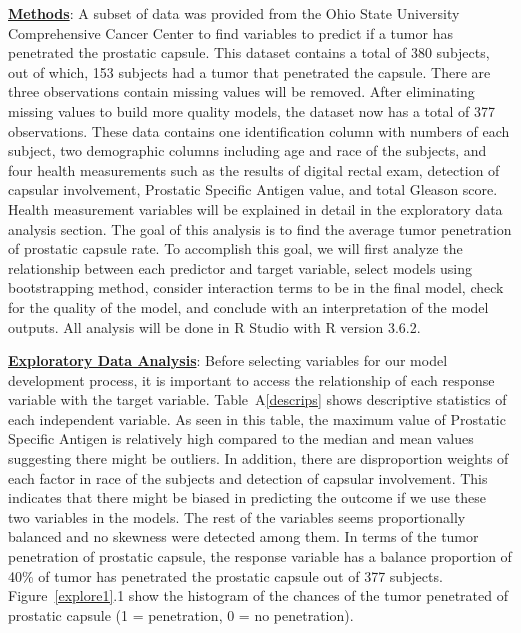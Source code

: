 \documentclass[11pt]{article}\usepackage[]{graphicx}\usepackage[]{color}
\begin{document}
\noindent\textbf{\underline{Methods}}: A subset of data was provided from the Ohio State University Comprehensive Cancer Center to find variables to predict if a tumor has penetrated the prostatic capsule. This dataset contains a total of 380 subjects, out of which, 153 subjects had a tumor that penetrated the capsule. There are three observations contain missing values will be removed. After eliminating missing values to build more quality models, the dataset now has a total of 377 observations. These data contains one identification column with numbers of each subject, two demographic columns including age and race of the subjects, and four health measurements such as the results of digital rectal exam, detection of capsular involvement, Prostatic Specific Antigen value, and total Gleason score. Health measurement variables will be explained in detail in the exploratory data analysis section. The goal of this analysis is to find the average tumor penetration of prostatic capsule rate. To accomplish this goal, we will first analyze the relationship between each predictor and target variable, select models using bootstrapping method, consider interaction terms to be in the final model, check for the quality of the model, and conclude with an interpretation of the model outputs. All analysis will be done in R Studio with R version 3.6.2.       
\hfill \break

\noindent\textbf{\underline{Exploratory Data Analysis}}: Before selecting variables for our model development process, it is important to access the relationship of each response variable with the target variable. Table~A\ref{descrips} shows descriptive statistics of each independent variable. As seen in this table, the maximum value of Prostatic Specific Antigen is relatively high compared to the median and mean values suggesting there might be outliers. In addition, there are disproportion weights of each factor in race of the subjects and detection of capsular involvement. This indicates that there might be biased in predicting the outcome if we use these two variables in the models. The rest of the variables seems proportionally balanced and no skewness were detected among them. In terms of the tumor penetration of prostatic capsule, the response variable has a balance proportion of 40\% of tumor has penetrated the prostatic capsule out of 377 subjects. Figure~\ref{explore1}.1 show the histogram of the chances of the tumor penetrated of prostatic capsule (1 = penetration, 0 = no penetration). 
\end{document}
